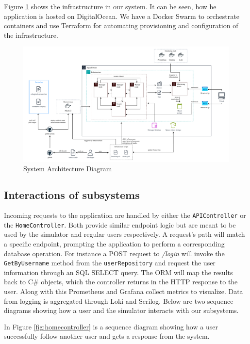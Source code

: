 \noindent Figure \ref{fig:architecture} shows the infrastructure in our system.
It can be seen, how he application is hosted on DigitalOcean. We have a Docker Swarm to orchestrate containers and use Terraform for automating provisioning and configuration of the infrastructure.

\begin{figure}[H]
    \centering
    \includegraphics[width=1.0\textwidth]{figures/devops-architecture-architecture_v2.pdf}
    \caption{System Architecture Diagram}
    \label{fig:architecture}
\end{figure}


\subsection{Interactions of subsystems}
\label{systems:interactions}
Incoming requests to the application are handled by either the \texttt{APIController} or the \texttt{HomeController}. Both provide similar endpoint logic but are meant to be used by the simulator and regular users respectively. A request's path will match a specific endpoint, prompting the application to perform a corresponding database operation. For instance a POST request to \textit{/login} will invoke the \texttt{GetByUsername} method from the \texttt{userRepository} and request the user information through an SQL SELECT query. The ORM will map the results back to C\# objects, which the controller returns in the HTTP response to the user. 
Along with this Prometheus and Grafana collect metrics to visualize. Data from logging is aggregated through Loki and Serilog. Below are two sequence diagrams showing how a user and the simulator interacts with our subsystems.\newline

\noindent In Figure \ref{fig:homecontroller} is a sequence diagram showing how a user successfully follow another user and gets a response from the system.\newline

